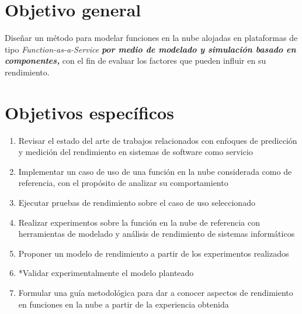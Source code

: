 \section{Objetivo general}
Diseñar un método para modelar funciones en la nube alojadas en plataformas de tipo \emph{Function-as-a-Service} \textbf{\emph{por medio de modelado y simulación basado en componentes,}} con el fin de evaluar los factores que pueden influir en su rendimiento. 

\section{Objetivos específicos}
\begin{enumerate}
    \item Revisar el estado del arte de trabajos relacionados con enfoques de predicción y medición del rendimiento en sistemas de software como servicio
    \item Implementar un caso de uso de una función en la nube considerada como de referencia, con el propósito de analizar su comportamiento
    \item Ejecutar pruebas de rendimiento sobre el caso de uso seleccionado 
    \item Realizar experimentos sobre la función en la nube de referencia con herramientas de modelado y análisis de rendimiento de sistemas informáticos     
    \item Proponer un modelo de rendimiento a partir de los experimentos realizados 
    \item {\Huge **}Validar experimentalmente el modelo planteado        
    \item Formular una guía metodológica para dar a conocer aspectos de rendimiento en funciones en la nube a partir de la experiencia obtenida
   
    
\end{enumerate}